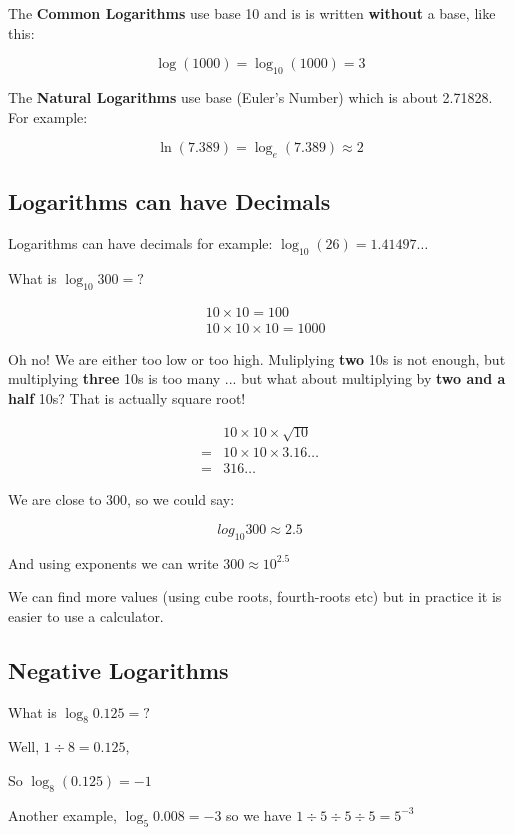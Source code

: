 The \textbf{Common Logarithms} use base 10 and is is written \textbf{without} a base, like this:

\[\log (1000)=\log_{10} (1000)=3\]

The \textbf{Natural Logarithms} use base  (Euler's Number) which is about 2.71828. For example:

\[\ln (7.389)=\log_e (7.389) \approx 2\]

\subsection{Logarithms can have Decimals}

Logarithms can have decimals for example: $\log_{10} (26)=1.41497\dotsc$

What is $\log_{10} 300=?$

\begin{align*}
  &10 \times 10=100\\
  &10 \times 10 \times 10=1000
\end{align*}

Oh no! We are either too low or too high. Muliplying \textbf{two} 10s is not enough, but multiplying \textbf{three} 10s is too many ... but what about multiplying by \textbf{two and a half} 10s? That is actually square root!

\begin{align*}
  &10\times 10 \times \sqrt{10}\\
  = &10\times 10 \times 3.16\dotsc\\
  = &316\dotsc
\end{align*}

We are close to 300, so we could say:

\[log_{10} 300 \approx 2.5\]

And using exponents we can write $300 \approx 10^{2.5}$

We can find more values (using cube roots, fourth-roots etc) but in practice it is easier to use a calculator.

\subsection{Negative Logarithms}

What is $\log_8 0.125=?$

Well, $1\div 8 =0.125$,

So $\log_8 (0.125)=-1$

Another example, $\log_5 0.008=-3$ so we have $1\div 5 \div 5 \div 5=5^{-3}$


